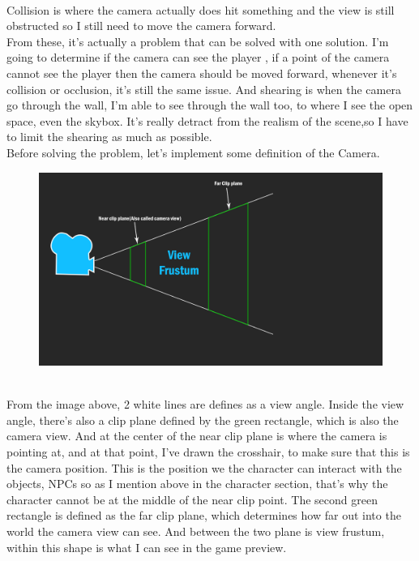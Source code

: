 \documentclass[a4paper, 13pt]{extarticle}
\begin{document}
 \\[0.05cm]
  Collision is where the camera actually does hit something and the view is still obstructed so I still need to move the camera forward. 
  \\[0.05cm] From these, it's actually a problem that can be solved with one solution. I'm going to determine if the camera can see the player , if a point of the camera cannot see the player then the camera should be moved forward, whenever it's collision or occlusion, it's still the same issue. And shearing is when the camera go through the wall, I'm able to see through the wall too, to where I see the open space, even the skybox. It's really detract from the realism of the scene,so I have to limit the shearing as much as possible.  	
  \\[0.15cm]
  Before solving the problem, let's implement some definition of the Camera.
  \begin{figure}[h]
  	\centering
  	\begin{minipage}{.4\textwidth}
  		\centering
  		\includegraphics[width=1.7\linewidth]{intructions/Camera_overview.png}
  		\centering
  		\label{fig:test12}
  	\end{minipage}
  \end{figure} 
\\[0.05cm]
From the image above, 2 white lines are defines as a view angle. Inside the view angle, there's also a clip plane defined by the green rectangle, which is also the camera view. And at the center of the near clip plane is where the camera is pointing at, and at that point, I've drawn the crosshair, to make sure that this is the camera position. This is the position we the character can interact with the objects, NPCs so as I mention above in the character section, that's why the character cannot be at the middle of the near clip point. The second green rectangle is defined as the far clip plane, which determines how far out into the world the camera view can see. And between the two plane is view frustum, within this shape is what I can see in the game preview.
\end{document}
